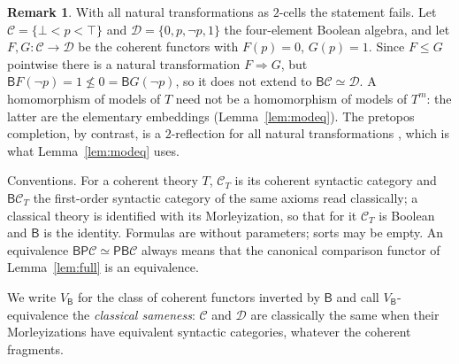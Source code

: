 \documentclass[11pt]{amsart}
\theoremstyle{definition}
\newtheorem{rem}[thm]{Remark}
\newcommand{\PP}{\mathsf P}
\newcommand{\BB}{\mathsf B}
\newcommand{\cC}{\mathcal C}
\newcommand{\cD}{\mathcal D}
\begin{document}
\begin{rem}\label{rem:21}
With all natural transformations as $2$-cells the statement fails. Let
$\cC=\{\bot<p<\top\}$ and $\cD=\{0,p,\neg p,1\}$ the four-element
Boolean algebra, and let $F,G\colon\cC\to\cD$ be the coherent functors
with $F(p)=0$, $G(p)=1$. Since $F\le G$ pointwise there is a natural
transformation $F\Rightarrow G$, but $\BB F(\neg p)=1\not\le0=\BB G(\neg
p)$, so it does not extend to $\BB\cC\simeq\cD$. A homomorphism of
models of $T$ need not be a homomorphism of models of $T^m$: the latter
are the elementary embeddings (Lemma~\ref{lem:modeq}). The pretopos
completion, by contrast, is a $2$-reflection for all natural
transformations \cite[A3.3]{Elephant}, which is what
Lemma~\ref{lem:modeq} uses.
\end{rem}

Conventions. For a coherent theory $T$, $\cC_T$ is its coherent
syntactic category and $\BB\cC_T$ the first-order syntactic category of
the same axioms read classically; a classical theory is identified with
its Morleyization, so that for it $\cC_T$ is Boolean and $\BB$ is the
identity. Formulas are without parameters; sorts may be empty. An
equivalence $\BB\PP\cC\simeq\PP\BB\cC$ always means that the canonical
comparison functor of Lemma~\ref{lem:full} is an equivalence.

We write $V_\BB$ for the class of coherent functors inverted by $\BB$ and
call $V_\BB$-equivalence the \emph{classical sameness}: $\cC$ and $\cD$
are classically the same when their Morleyizations have equivalent
syntactic categories, whatever the coherent fragments.
\end{document}
